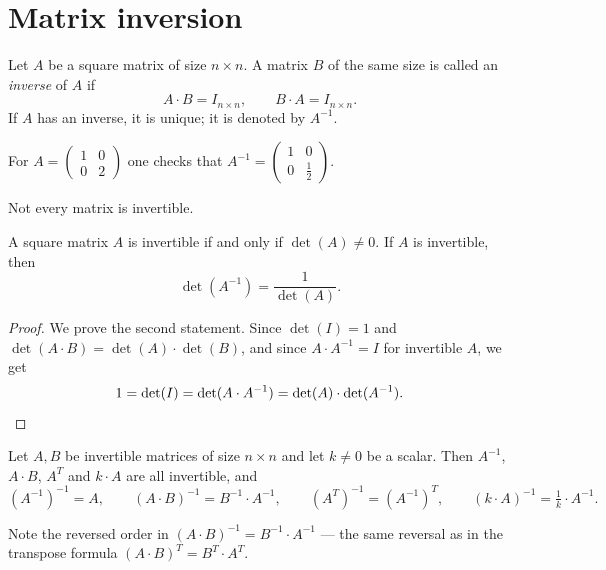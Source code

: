 \section{Matrix inversion}

\begin{definition}
Let $A$ be a square matrix of size $n\times n$. A matrix $B$ of the same size is called an \emph{inverse} of
$A$ if
\[
A\cdot B = I_{n\times n}, \qquad B\cdot A = I_{n\times n}.
\]
If $A$ has an inverse, it is unique; it is denoted by $A^{-1}$.
\end{definition}

\begin{example}
For $A = \left ( \begin{smallmatrix} 1 & 0\\ 0 & 2 \end{smallmatrix} \right )$ one checks that
$A^{-1} = \left ( \begin{smallmatrix} 1 & 0\\ 0 & \tfrac12 \end{smallmatrix} \right )$.
\end{example}

\begin{warning}
Not every matrix is invertible.
\end{warning}

\begin{theorem}
A square matrix $A$ is invertible if and only if $\det(A)\neq 0$. If $A$ is invertible, then
\[
\det(A^{-1}) = \frac{1}{\det(A)}.
\]
\end{theorem}

\begin{proof}
We prove the second statement. Since $\det(I) = 1$ and $\det(A\cdot B) = \det(A)\cdot \det(B)$, and since
$A\cdot A^{-1} = I$ for invertible $A$, we get
\[
1 = \det(I) = \det(A\cdot A^{-1}) = \det(A)\cdot \det(A^{-1}). \qedhere
\]
\end{proof}

\begin{theorem}
Let $A,B$ be invertible matrices of size $n\times n$ and let $k\neq 0$ be a scalar. Then $A^{-1}$,
$A\cdot B$, $A^T$ and $k\cdot A$ are all invertible, and
\[
(A^{-1})^{-1} = A, \qquad (A\cdot B)^{-1} = B^{-1}\cdot A^{-1}, \qquad (A^T)^{-1} = (A^{-1})^T,
\qquad (k\cdot A)^{-1} = \tfrac1k\cdot A^{-1}.
\]
\end{theorem}

\begin{warning}
Note the reversed order in $(A\cdot B)^{-1} = B^{-1}\cdot A^{-1}$ — the same reversal as in the transpose
formula $(A\cdot B)^T = B^T\cdot A^T$.
\end{warning}


